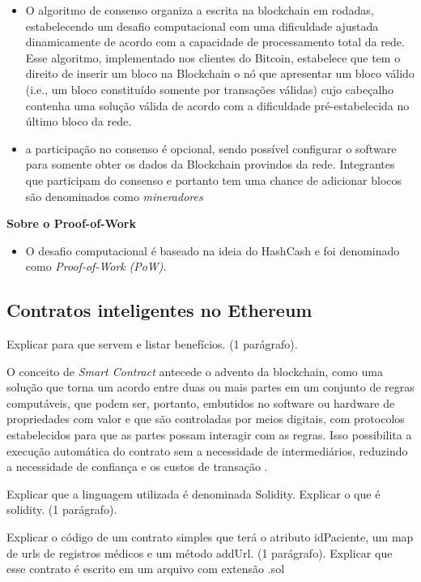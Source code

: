 \documentclass[a4paper,11pt]{article}
\begin{document}
\begin{itemize}
    \item O algoritmo de consenso organiza a escrita na blockchain em rodadas, estabelecendo um desafio computacional com uma dificuldade ajustada dinamicamente de acordo com a capacidade de processamento total da rede. Esse algoritmo, implementado nos clientes do Bitcoin, estabelece que tem o direito de inserir um bloco na Blockchain o nó que apresentar um bloco válido (i.e., um bloco constituído somente por transações válidas) cujo cabeçalho contenha uma solução válida de acordo com a dificuldade pré-estabelecida no último bloco da rede.
    \item a participação no consenso é opcional, sendo possível configurar o software para somente obter os dados da Blockchain provindos da rede. Integrantes que participam do consenso e portanto tem uma chance de adicionar blocos são denominados como \emph{mineradores}
\end{itemize}

 \textbf{Sobre o Proof-of-Work}

\begin{itemize}
    \item O desafio computacional é baseado na ideia do HashCash \cite{Back2002} e foi denominado como \emph{Proof-of-Work} \emph{(PoW)}.
\end{itemize}
\subsection{Contratos inteligentes no Ethereum}

{\color{ForestGreen}Explicar para que servem e listar benefícios. (1 parágrafo).}

O conceito de \emph{Smart Contract} antecede o advento da blockchain,
como uma solução que torna um acordo entre duas ou mais partes em um conjunto de regras computáveis, que podem ser, portanto, embutidos no software ou hardware de propriedades com valor e que são controladas por meios digitais, com protocolos estabelecidos para que as partes possam interagir com as regras. Isso possibilita a execução automática do contrato sem a necessidade de intermediários, reduzindo a necessidade de confiança e os custos de transação \cite{Bartoletti2019, Szabo1996}.


{\color{ForestGreen}Explicar que a linguagem utilizada é denominada Solidity. Explicar o que é solidity. (1 parágrafo).}

{\color{ForestGreen}Explicar o código de um contrato simples que terá o atributo idPaciente, um map de urls de registros médicos e um método addUrl. (1 parágrafo). Explicar que esse contrato é escrito em um arquivo com extensão .sol}
\end{document}
